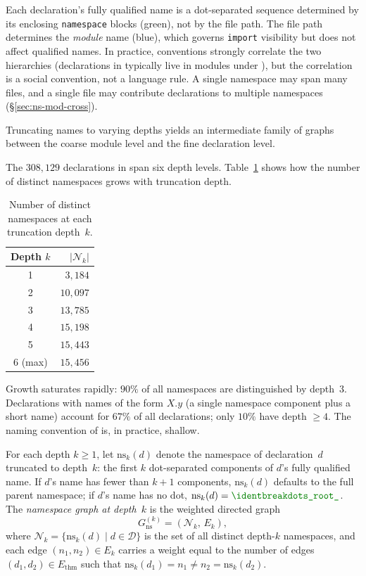 \noindent
Each declaration's fully qualified name is a dot-separated sequence determined by its enclosing \texttt{namespace} blocks (\textcolor{green!50!black}{green}), not by the file path. The file path determines the \emph{module} name (\textcolor{blue!60!black}{blue}), which governs \texttt{import} visibility but does not affect qualified names. In practice,  conventions strongly correlate the two hierarchies (declarations in  typically live in modules under ), but the correlation is a social convention, not a language rule. A single namespace may span many files, and a single file may contribute declarations to multiple namespaces (\S\ref{sec:ns-mod-cross}).

Truncating names to varying depths yields an intermediate family of graphs between the coarse module level and the fine declaration level.

The $308{,}129$ declarations in  span six depth levels. Table~\ref{tab:ns-depth-count} shows how the number of distinct namespaces grows with truncation depth.
\begin{table}[ht]
\centering
\caption{Number of distinct namespaces at each truncation depth~$k$.}
\label{tab:ns-depth-count}
\begin{tabular}{cr}
\toprule
Depth $k$ & $|\mathcal{N}_k|$ \\
\midrule
1          & $3{,}184$ \\
2          & $10{,}097$ \\
3          & $13{,}785$ \\
4          & $15{,}198$ \\
5          & $15{,}443$ \\
6 (max)    & $15{,}456$ \\
\bottomrule
\end{tabular}
\end{table}

\noindent
Growth saturates rapidly: $90\%$ of all namespaces are distinguished by depth~$3$. Declarations with names of the form $X.y$ (a single namespace component plus a short name) account for $67\%$ of all declarations; only $10\%$ have depth $\ge 4$. The naming convention of  is, in practice, shallow.

\begin{definition}
\label{def:ns-graph}
For each depth $k \ge 1$, let $\mathrm{ns}_k(d)$ denote the namespace of declaration~$d$ truncated to depth~$k$: the first $k$ dot-separated components of $d$'s fully qualified name. If $d$'s name has fewer than $k+1$ components, $\mathrm{ns}_k(d)$ defaults to the full parent namespace; if $d$'s name has no dot, $\mathrm{ns}_k(d) = \ns{\_root\_}$. The \emph{namespace graph at depth~$k$} is the weighted directed graph
\[
  G_{\mathrm{ns}}^{(k)} = (\mathcal{N}_k,\, E_k),
\]
where $\mathcal{N}_k = \{\mathrm{ns}_k(d) \mid d \in \mathcal{D}\}$ is the set of all distinct depth-$k$ namespaces, and each edge $(n_1, n_2) \in E_k$ carries a weight equal to the number of edges $(d_1, d_2) \in E_{\mathrm{thm}}$ such that $\mathrm{ns}_k(d_1) = n_1 \neq n_2 = \mathrm{ns}_k(d_2)$.
\end{definition}

